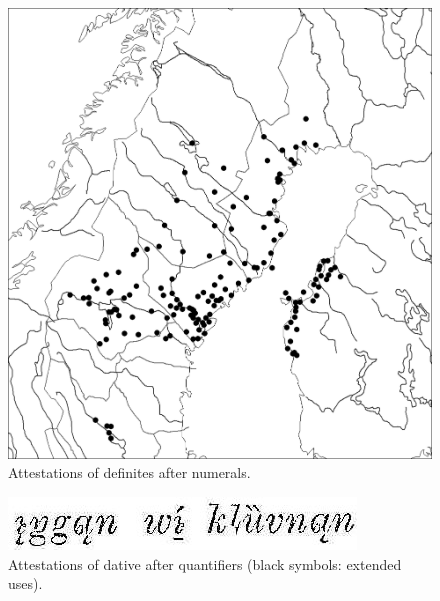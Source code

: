 \begin{figure}[h]
\includegraphics{figures_mod/image13}
\caption{Attestations of definites after numerals.}
\label{map:13}

\end{figure}

\begin{figure}[h]
\includegraphics{figures_mod/image14}
\caption{Attestations of dative after quantifiers (black symbols: extended uses).}
\label{map:14}

\end{figure}

